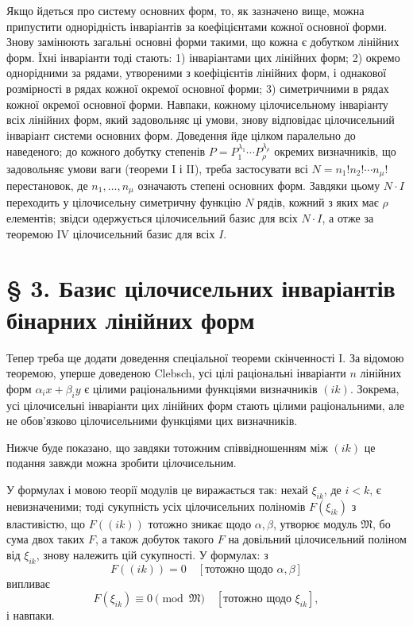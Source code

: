 \documentclass[11pt]{article}
\providecommand{\frM}{\mathfrak M}
\begin{document}
Якщо йдеться про систему основних форм, то, як зазначено вище, можна припустити однорідність інваріантів за коефіцієнтами кожної основної форми. Знову замінюють загальні основні форми такими, що кожна є добутком лінійних форм. Їхні інваріанти тоді стають: 1) інваріантами цих лінійних форм; 2) окремо однорідними за рядами, утвореними з коефіцієнтів лінійних форм, і однакової розмірності в рядах кожної окремої основної форми; 3) симетричними в рядах кожної окремої основної форми. Навпаки, кожному цілочисельному інваріанту всіх лінійних форм, який задовольняє ці умови, знову відповідає цілочисельний інваріант системи основних форм. Доведення йде цілком паралельно до наведеного; до кожного добутку степенів \(P=P_1^{\lambda_1}\cdots P_\rho^{\lambda_\rho}\) окремих визначників, що задовольняє умови ваги (теореми I і II), треба застосувати всі \(N=n_1!n_2!\cdots n_\mu!\) перестановок, де \(n_1,\ldots,n_\mu\) означають степені основних форм. Завдяки цьому \(N\cdot I\) переходить у цілочисельну симетричну функцію \(N\) рядів, кожний з яких має \(\rho\) елементів; звідси одержується цілочисельний базис для всіх \(N\cdot I\), а отже за теоремою IV цілочисельний базис для всіх \(I\).

\setcounter{equation}{0}
\section*{§ 3. Базис цілочисельних інваріантів бінарних лінійних форм}

Тепер треба ще додати доведення спеціальної теореми скінченності I. За відомою теоремою, уперше доведеною Clebsch, усі цілі раціональні інваріанти \(n\) лінійних форм \(\alpha_i x+\beta_i y\) є цілими раціональними функціями визначників \((ik)\). Зокрема, усі цілочисельні інваріанти цих лінійних форм стають цілими раціональними, але не обов'язково цілочисельними функціями цих визначників.

Нижче буде показано, що завдяки тотожним співвідношенням між \((ik)\) це подання завжди можна зробити цілочисельним.

У формулах і мовою теорії модулів це виражається так: нехай \(\xi_{ik}\), де \(i<k\), є невизначеними; тоді сукупність усіх цілочисельних поліномів \(F(\xi_{ik})\) з властивістю, що \(F((ik))\) тотожно зникає щодо \(\alpha,\beta\), утворює модуль \(\frM\), бо сума двох таких \(F\), а також добуток такого \(F\) на довільний цілочисельний поліном від \(\xi_{ik}\), знову належить цій сукупності. У формулах: з
\[
        F((ik))=0\quad [\text{тотожно щодо \(\alpha,\beta\)}]
\]
випливає
\[
        F(\xi_{ik})\equiv0\pmod{\frM}\quad [\text{тотожно щодо \(\xi_{ik}\)}],
\]
і навпаки.
\end{document}
